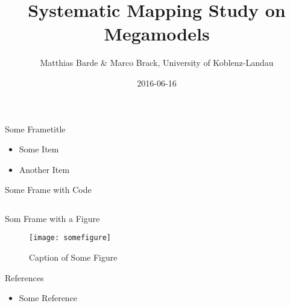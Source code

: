\documentclass{beamer}
\title[Summary]{Systematic Mapping Study on Megamodels}
\author{Matthias Barde \& Marco Brack, University of Koblenz-Landau}
\institute{SLE course SS 2016 (\url{http://www.softlang.org/course:sle16})}
\date{2016-06-16}
\begin{document}
\begin{frame}
\titlepage
\end{frame}


\begin{frame}{Some Frametitle}
  \begin{itemize}
    \item Some Item
    \item Another Item
  \end{itemize}
\end{frame}

\begin{frame}{Some Frame with Code}
  \inputminted[frame=single, linenos]{JavaScript}{some-code.js}
\end{frame}

\begin{frame}{Som Frame with a Figure }
  \begin{figure}[p]
    \centering
    \texttt{[image: somefigure]}
    \caption{Caption of Some Figure}
    \label{fig:somefigure}
  \end{figure}
\end{frame}

\begin{frame}{References}
  \begin{itemize}
    \item Some Reference
  \end{itemize}
\end{frame}
\end{document}
